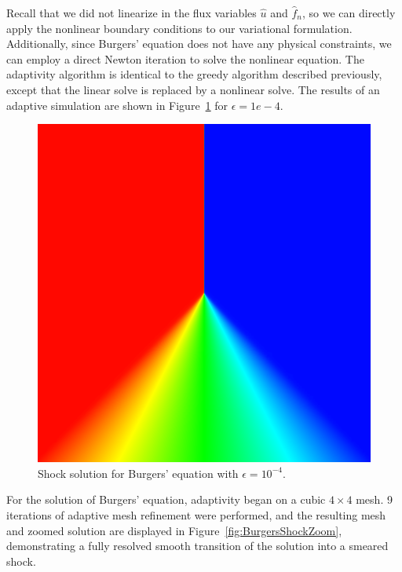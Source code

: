 Recall that we did not linearize in the flux variables $\widehat{u}$ and $\widehat{f}_n$, so we can directly apply the nonlinear boundary conditions to our variational formulation.  
Additionally, since Burgers' equation does not have any physical constraints, we can employ a direct Newton iteration to solve the nonlinear equation.  The adaptivity algorithm is identical to the greedy algorithm described previously, except that the linear solve is replaced by a nonlinear solve.  The results of an adaptive simulation are shown in Figure~\ref{fig:BurgersShock} for $\epsilon = 1e-4$.  
\begin{figure}[!h]
\centering
\includegraphics[scale=.4]{figs/burgers.png}
\caption{Shock solution for Burgers' equation with $\epsilon = 10^{-4}$.} 
\label{fig:BurgersShock}
\end{figure}

For the solution of Burgers' equation, adaptivity began on a cubic $4\times 4$ mesh.  9 iterations of adaptive mesh refinement were performed, and the resulting mesh and zoomed solution are displayed in Figure~\ref{fig:BurgersShockZoom}, demonstrating a fully resolved smooth transition of the solution into a smeared shock.  

